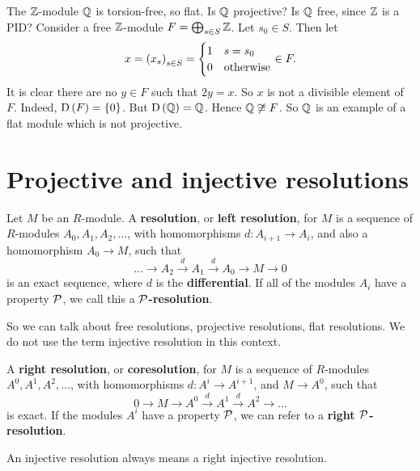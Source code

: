 \begin{example*}
The $ \mathbb{Z} $-module $ \mathbb{Q} $ is torsion-free, so flat. Is $ \mathbb{Q} $ projective? Is $ \mathbb{Q} $ free, since $ \mathbb{Z} $ is a PID? Consider a free $ \mathbb{Z} $-module $ F = \bigoplus_{s \in S} \mathbb{Z} $. Let $ s_0 \in S $. Then let
$$ x = \br{x_s}_{s \in S} =
\begin{cases}
1 & s = s_0 \\
0 & \text{otherwise}
\end{cases}
\in F. $$
It is clear there are no $ y \in F $ such that $ 2y = x $. So $ x $ is not a divisible element of $ F $. Indeed, $ \D\br{F} = \cbr{0} $. But $ \D\br{\QQ} = \QQ $. Hence $ \mathbb{Q} \not\cong F $. So $ \mathbb{Q} $ is an example of a flat module which is not projective.
\end{example*}

\pagebreak

\section{Projective and injective resolutions}

\begin{definition}
Let $ M $ be an $ R $-module. A \textbf{resolution}, or \textbf{left resolution}, for $ M $ is a sequence of $ R $-modules $ A_0, A_1, A_2, \dots $, with homomorphisms $ d : A_{i + 1} \to A_i $, and also a homomorphism $ A_0 \to M $, such that
$$ \dots \to A_2 \xrightarrow{d} A_1 \xrightarrow{d} A_0 \to M \to 0 $$
is an exact sequence, where $ d $ is the \textbf{differential}. If all of the modules $ A_i $ have a property $ \mathcal{P} $, we call this a \textbf{$ \mathcal{P} $-resolution}.
\end{definition}

So we can talk about free resolutions, projective resolutions, flat resolutions. We do not use the term injective resolution in this context.

\begin{definition}
A \textbf{right resolution}, or \textbf{coresolution}, for $ M $ is a sequence of $ R $-modules $ A^0, A^1, A^2, \dots $, with homomorphisms $ d : A^i \to A^{i + 1} $, and $ M \to A^0 $, such that
$$ 0 \to M \to A^0 \xrightarrow{d} A^1 \xrightarrow{d} A^2 \to \dots $$
is exact. If the modules $ A^i $ have a property $ \mathcal{P} $, we can refer to a \textbf{right $ \mathcal{P} $-resolution}.
\end{definition}

An injective resolution always means a right injective resolution.

